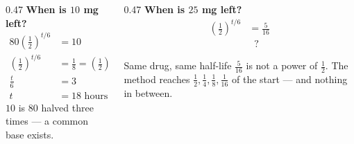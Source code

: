 \documentclass[aspectratio=169, 11pt]{beamer}
\begin{document}
\begin{frame}[t, plain]
  \begin{columns}[T]
    \begin{column}{0.47\textwidth}
      \footnotesize
      \textbf{When is $10$ mg left?}
      \begin{align*}
        80\left(\tfrac12\right)^{t/6} &= 10 \\
        \left(\tfrac12\right)^{t/6} &= \tfrac18 = \left(\tfrac12\right)^{3} \\
        \tfrac{t}{6} &= 3 \\
        t &= 18 \text{ hours}
      \end{align*}
      {\scriptsize $10$ is $80$ halved three times --- a common base exists.}
    \end{column}
    \begin{column}{0.47\textwidth}
      \footnotesize
      \textbf{When is $25$ mg left?}
      \begin{align*}
        \left(\tfrac12\right)^{t/6} &= \tfrac{5}{16} \\
        &\;\;?
      \end{align*}
      \vspace{-6pt}
      \begin{block}{Same drug, same half-life}
        \footnotesize $\frac{5}{16}$ is not a power of $\frac12$. The method reaches
        $\frac12,\frac14,\frac18,\frac1{16}$ of the start --- and nothing in between.
      \end{block}
    \end{column}
  \end{columns}
\end{frame}
\end{document}
